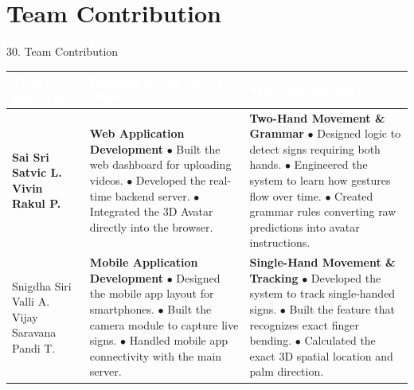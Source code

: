 \documentclass[aspectratio=169]{beamer}
\begin{document}
\section{Team Contribution}
\begin{frame}{30. Team Contribution}
    
    
    \vspace{2mm}
    \begin{center}
    \renewcommand{\arraystretch}{1.6} 
    {\fontsize{7pt}{9pt}\selectfont
    \begin{tabular}{|>{\raggedright\arraybackslash\bfseries}p{}|>{\raggedright\arraybackslash}p{}|>{\raggedright\arraybackslash}p{}|}
        \hline
        \rowcolor{maroon}
        \textcolor{white}{\textbf{Team Members}} & 
        \textcolor{white}{\textbf{Platform \& Application Work}} & 
        \textcolor{white}{\textbf{Sign Language Engine}} \\
        \hline
        
        Sai Sri Satvic L. \newline Vivin Rakul P. & 
        \textbf{Web Application Development}\newline
        $\bullet$ Built the web dashboard for uploading videos.\newline
        $\bullet$ Developed the real-time backend server.\newline
        $\bullet$ Integrated the 3D Avatar directly into the browser. & 
        \textbf{Two-Hand Movement \& Grammar}\newline
        $\bullet$ Designed logic to detect signs requiring both hands.\newline
        $\bullet$ Engineered the system to learn how gestures flow over time.\newline
        $\bullet$ Created grammar rules converting raw predictions into avatar instructions. \\
        \hline
        
        Snigdha Siri Valli A. \newline Vijay Saravana Pandi T. & 
        \textbf{Mobile Application Development}\newline
        $\bullet$ Designed the mobile app layout for smartphones.\newline
        $\bullet$ Built the camera module to capture live signs.\newline
        $\bullet$ Handled mobile app connectivity with the main server. & 
        \textbf{Single-Hand Movement \& Tracking}\newline
        $\bullet$ Developed the system to track single-handed signs.\newline
        $\bullet$ Built the feature that recognizes exact finger bending.\newline
        $\bullet$ Calculated the exact 3D spatial location and palm direction. \\
        \hline
    \end{tabular}
    }
    \end{center}
\end{frame}
\end{document}

